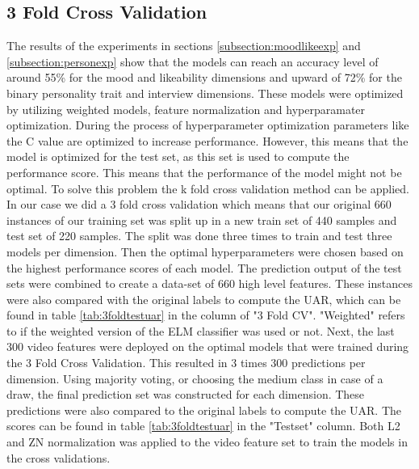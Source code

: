 \subsection{3 Fold Cross Validation}\label{subsection:3foldcv}
The results of the experiments in sections \ref{subsection:moodlikeexp} and \ref{subsection:personexp} show that the models can reach an accuracy level of around 55\% for the mood and likeability dimensions and upward of 72\% for the binary personality trait and interview dimensions. These models were optimized by utilizing weighted models, feature normalization and hyperparamater optimization. During the process of hyperparameter optimization parameters like the C value are optimized to increase performance. However, this means that the model is optimized for the test set, as this set is used to compute the performance score. This means that the performance of the model might not be optimal. To solve this problem the k fold cross validation method can be applied. In our case we did a 3 fold cross validation which means that our original 660 instances of our training set was split up in a new train set of 440 samples and test set of 220 samples. The split was done three times to train and test three models per dimension. Then the optimal hyperparameters were chosen based on the highest performance scores of each model. The prediction output of the test sets were combined to create a data-set of 660 high level features. These instances were also compared with the original labels to compute the UAR, which can be found in table \ref{tab:3foldtestuar} in the column of "3 Fold CV". "Weighted" refers to if the weighted version of the ELM classifier was used or not. Next, the last 300 video features were deployed on the optimal models that were trained during the 3 Fold Cross Validation. This resulted in 3 times 300 predictions per dimension. Using majority voting, or choosing the medium class in case of a draw, the final prediction set was constructed for each dimension. These predictions were also compared to the original labels to compute the UAR. The scores can be found in table \ref{tab:3foldtestuar} in the "Testset" column. Both L2 and ZN normalization was applied to the video feature set to train the models in the cross validations. 



